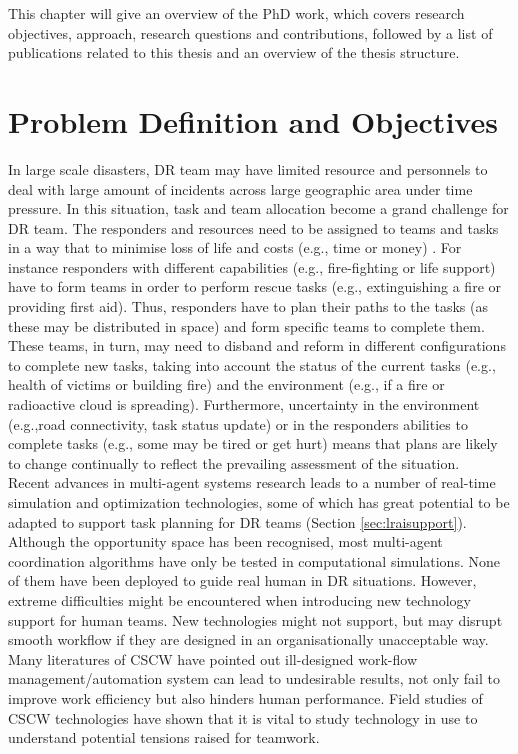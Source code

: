 This chapter will give an overview of the PhD work, which covers research objectives, approach, research questions and contributions, followed by a list of publications related to this thesis and an overview of the thesis structure.\\


\section{Problem Definition and Objectives}
In large scale disasters, \ac{DR} team may have limited resource and personnels to deal with large amount of incidents across large geographic area under time pressure. In this situation, task and team allocation become a grand challenge for \ac{DR} team. The responders and resources need to be assigned to teams and tasks in a way that to minimise loss of life and costs (e.g., time or money) . For instance responders with different capabilities (e.g., fire-fighting or life support) have to form teams in order to perform rescue tasks (e.g., extinguishing a fire or providing first aid). Thus, responders have to plan their paths to the tasks (as these may be distributed in space) and form specific teams to complete them. These teams, in turn, may need to disband and reform in different configurations to complete new tasks, taking into account the status of the current tasks (e.g., health of victims or building fire) and the environment (e.g., if a fire or radioactive cloud is spreading). Furthermore, uncertainty in the environment (e.g.,road connectivity, task status update) or in the responders abilities to complete tasks (e.g., some may be tired or get hurt) means that plans are likely to change continually to reflect the prevailing assessment of the situation.\\

Recent advances in multi-agent systems research leads to a number of real-time simulation and optimization technologies, some of which has great potential to be adapted to support task planning for \ac{DR} teams (Section \ref{sec:lraisupport}). Although the opportunity space has been recognised, most multi-agent coordination algorithms have only be tested in computational simulations. None of them have been deployed to guide real human in \ac{DR} situations. However, extreme difficulties might be encountered when introducing new technology support for human teams. New technologies might not support, but may disrupt smooth workflow if they are designed in an organisationally unacceptable way. Many  literatures of \ac{CSCW} have pointed out ill-designed work-flow management/automation system can lead to undesirable results, not only fail to improve work efficiency but also hinders human performance. Field studies of \ac{CSCW} technologies have shown that it is vital to study technology in use to understand potential tensions raised for teamwork. \\

